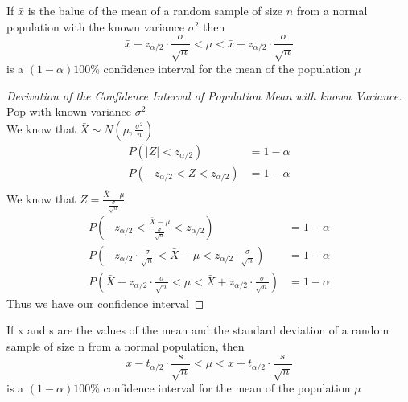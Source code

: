 \documentclass[answers,12pt,addpoints]{exam}
\begin{document}
\begin{theorem}
    If $\bar{x}$ is the balue of the mean of a random sample of size $n$ from a normal population with the known variance $\sigma^2$ then 
    $$ \bar{x} - z_{\alpha/2} \cdot \frac{\sigma}{\sqrt{n}} < \mu < \bar{x} + z_{\alpha/2} \cdot \frac{\sigma}{\sqrt{n}}$$
    is a $(1-\alpha)100$\% confidence interval for the mean of the population $\mu$  
\end{theorem}

\begin{proof}[Derivation of the Confidence Interval of Population Mean with known Variance]
    Pop with known variance $\sigma^2$\\
    We know that $\bar{X} \sim N(\mu, \frac{\sigma^2}{n})$\\
    \begin{align*}
        P(|Z| < z_{\alpha/2}) &= 1 - \alpha\\
        P(-z_{\alpha/2} < Z < z_{\alpha/2}) &= 1 - \alpha\\
    \end{align*}
    We know that $Z = \frac{\bar{X} - \mu}{\frac{\sigma}{\sqrt{n}}}$
    \begin{align*}
        P(-z_{\alpha/2} < \frac{\bar{X} - \mu}{\frac{\sigma}{\sqrt{n}}} < z_{\alpha/2}) &= 1 - \alpha\\
        P(-z_{\alpha/2} \cdot \frac{\sigma}{\sqrt{n}} < \bar{X} - \mu < z_{\alpha/2} \cdot \frac{\sigma}{\sqrt{n}}) &= 1 - \alpha\\
        P(\bar{X} - z_{\alpha/2} \cdot \frac{\sigma}{\sqrt{n}} < \mu < \bar{X} + z_{\alpha/2} \cdot \frac{\sigma}{\sqrt{n}}) &= 1 - \alpha
    \end{align*}
    Thus we have our confidence interval
\end{proof}

\begin{theorem}
    If x and s are the values of the mean and the standard deviation of a random sample of size n from a normal population, then
    $$ x - t_{\alpha/2} \cdot \frac{s}{\sqrt{n}} < \mu < x + t_{\alpha/2} \cdot \frac{s}{\sqrt{n}}$$
    is a $(1-\alpha)100$\% confidence interval for the mean of the population $\mu$
\end{theorem}
\end{document}
